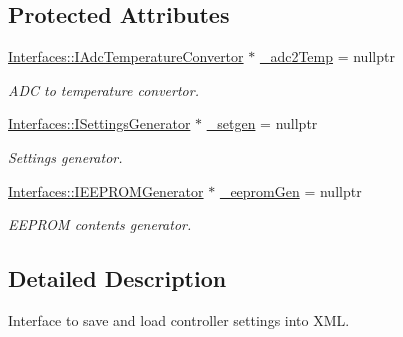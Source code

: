 \subsection*{Protected Attributes}
\begin{DoxyCompactItemize}
\item 
\mbox{\label{class_interfaces_1_1_i_settings_saver_loader_accc3becffc7bb3688db96f3f34a68b80}} 
\hyperlink{class_interfaces_1_1_i_adc_temperature_convertor}{Interfaces\+::\+I\+Adc\+Temperature\+Convertor} $\ast$ \hyperlink{class_interfaces_1_1_i_settings_saver_loader_accc3becffc7bb3688db96f3f34a68b80}{\+\_\+adc2\+Temp} = nullptr
\begin{DoxyCompactList}\small\item\em A\+DC to temperature convertor. \end{DoxyCompactList}\item 
\mbox{\label{class_interfaces_1_1_i_settings_saver_loader_a7b2968ed33e6f5e2cc3b863649aa7f17}} 
\hyperlink{class_interfaces_1_1_i_settings_generator}{Interfaces\+::\+I\+Settings\+Generator} $\ast$ \hyperlink{class_interfaces_1_1_i_settings_saver_loader_a7b2968ed33e6f5e2cc3b863649aa7f17}{\+\_\+setgen} = nullptr
\begin{DoxyCompactList}\small\item\em Settings generator. \end{DoxyCompactList}\item 
\mbox{\label{class_interfaces_1_1_i_settings_saver_loader_a14446fa4caf99dcbfd748eaaa4ef3596}} 
\hyperlink{class_interfaces_1_1_i_e_e_p_r_o_m_generator}{Interfaces\+::\+I\+E\+E\+P\+R\+O\+M\+Generator} $\ast$ \hyperlink{class_interfaces_1_1_i_settings_saver_loader_a14446fa4caf99dcbfd748eaaa4ef3596}{\+\_\+eeprom\+Gen} = nullptr
\begin{DoxyCompactList}\small\item\em E\+E\+P\+R\+OM contents generator. \end{DoxyCompactList}\end{DoxyCompactItemize}


\subsection{Detailed Description}
Interface to save and load controller settings into X\+ML. 

